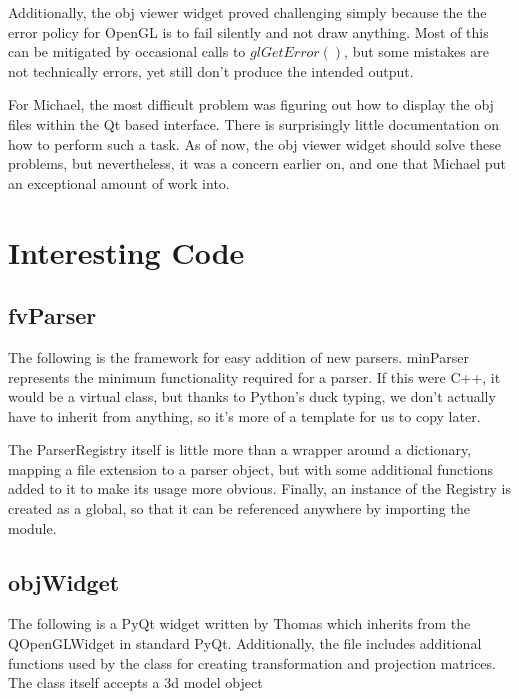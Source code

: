 \documentclass[letterpaper,10pt, onecolumn, draftclsnofoot]{IEEEtran}
\begin{document}
Additionally, the obj viewer widget proved challenging simply because the the error policy for OpenGL is to fail silently and not draw anything. Most of this can be mitigated by occasional calls to $glGetError()$, but some mistakes are not technically errors, yet still don't produce the intended output.

For Michael, the most difficult problem was figuring out how to display the obj files within the Qt based interface. There is surprisingly little documentation on how to perform such a task. As of now, the obj viewer widget should solve these problems, but nevertheless, it was a concern earlier on, and one that Michael put an exceptional amount of work into.

\section{Interesting Code} \label{interestingCode}

\subsection{fvParser} 

The following is the framework for easy addition of new parsers. minParser represents the minimum functionality required for a parser. If this were C++, it would be a virtual class, but thanks to Python's duck typing, we don't actually have to inherit from anything, so it's more of a template for us to copy later.

The ParserRegistry itself is little more than a wrapper around a dictionary, mapping a file extension to a parser object, but with some additional functions added to it to make its usage more obvious. Finally, an instance of the Registry is created as a global, so that it can be referenced anywhere by importing the module.



\subsection{objWidget} 

The following is a PyQt widget written by Thomas which inherits from the QOpenGLWidget in standard PyQt. Additionally, the file includes additional functions used by the class for creating transformation and projection matrices. The class itself accepts a 3d model object


\end{document}

